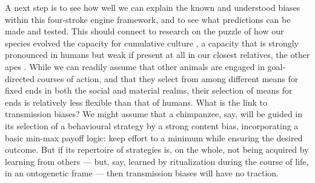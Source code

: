A next step is to see how well we can explain the known and understood biases 
within this four-stroke engine framework, and to see what predictions can be made and tested. This should connect to research 
on the puzzle of how our species evolved the capacity for cumulative 
culture \citep{tomasello_cultural_1999}, a capacity that is strongly pronounced in humans but weak 
if present at all in our closest relatives, the other apes \citep{herrmann_humans_2007}. While we can readily assume that other animals are 
engaged in goal-directed courses of action, and that they select from 
among different means for fixed ends in both the social and material 
realms, their selection of means for ends is relatively less flexible 
than that of humans. What is the link to transmission biases? We might assume that a chimpanzee, say, will be guided in its selection 
of a behavioural strategy by a strong content bias, incorporating a 
basic min-max payoff logic: keep effort to a minimum while ensuring the desired outcome. But if its repertoire of strategies is, on 
the whole, not being acquired by learning from others --- but, say, learned by ritualization during the course of life, in an ontogenetic frame --- then transmission 
biases will have no traction. 







 

\newpage
